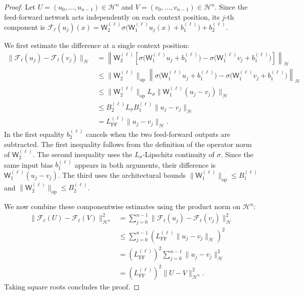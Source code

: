 \begin{proof}
Let \(U=(u_0,\ldots,u_{n-1})\in \mathcal H^n\) and \(V=(v_0,\ldots,v_{n-1})\in\mathcal H^n\). Since the feed-forward network acts independently on each context position, its \(j\)-th component is
\(
\mathcal F_\ell(u_j)(x)
=
\mathsf W_2^{(\ell)}
\sigma\bigl(
\mathsf W_1^{(\ell)}u_j(x)+b_1^{(\ell)}
\bigr)
+
b_2^{(\ell)}
\).

We first estimate the difference at a single context position:
\[
\begin{aligned}
\|\mathcal F_\ell(u_j)-\mathcal F_\ell(v_j)\|_{\mathcal H}
&=
\left\|
\mathsf W_2^{(\ell)}
\left[
\sigma\bigl(\mathsf W_1^{(\ell)}u_j+b_1^{(\ell)}\bigr)
-
\sigma\bigl(\mathsf W_1^{(\ell)}v_j+b_1^{(\ell)}\bigr)
\right]
\right\|_{\mathcal H}\\
&\leqslant
\|\mathsf W_2^{(\ell)}\|_{\mathrm{op}}
\left\|
\sigma\bigl(\mathsf W_1^{(\ell)}u_j+b_1^{(\ell)}\bigr)
-
\sigma\bigl(\mathsf W_1^{(\ell)}v_j+b_1^{(\ell)}\bigr)
\right\|_{\mathcal H}\\
&\leqslant
\|\mathsf W_2^{(\ell)}\|_{\mathrm{op}}
L_\sigma
\|\mathsf W_1^{(\ell)}(u_j-v_j)\|_{\mathcal H}\\
&\leqslant
B_2^{(\ell)}
L_\sigma
B_1^{(\ell)}
\|u_j-v_j\|_{\mathcal H}\\
&=
L_{\mathrm{FF}}^{(\ell)}
\|u_j-v_j\|_{\mathcal H}.
\end{aligned}
\]
In the first equality \(b_2^{(\ell)}\) cancels when the two feed-forward outputs are subtracted. The first inequality follows from the definition of the operator norm of \(\mathsf W_2^{(\ell)}\). The second inequality uses the \(L_\sigma\)-Lipschitz continuity of \(\sigma\). Since the same input bias \(b_1^{(\ell)}\) appears in both arguments, their difference is \(\mathsf W_1^{(\ell)}(u_j-v_j)\). The third uses the architectural bounds \(\|\mathsf W_1^{(\ell)}\|_{\mathrm{op}}\leqslant B_1^{(\ell)}\) and \(\|\mathsf W_2^{(\ell)}\|_{\mathrm{op}}\leqslant B_2^{(\ell)}\).

We now combine these componentwise estimates using the product norm on \(\mathcal H^n\):
\[
\begin{aligned}
\|\mathcal F_\ell(U)-\mathcal F_\ell(V)\|_{\mathcal H^n}^2
&=
\sum_{j=0}^{n-1}
\|\mathcal F_\ell(u_j)-\mathcal F_\ell(v_j)\|_{\mathcal H}^2\\
&\leqslant
\sum_{j=0}^{n-1}
\left(
L_{\mathrm{FF}}^{(\ell)}
\|u_j-v_j\|_{\mathcal H}
\right)^2\\
&=
\left(
L_{\mathrm{FF}}^{(\ell)}
\right)^2
\sum_{j=0}^{n-1}
\|u_j-v_j\|_{\mathcal H}^2\\
&=
\left(
L_{\mathrm{FF}}^{(\ell)}
\right)^2
\|U-V\|_{\mathcal H^n}^2.
\end{aligned}
\]
Taking square roots concludes the proof.
\end{proof}

